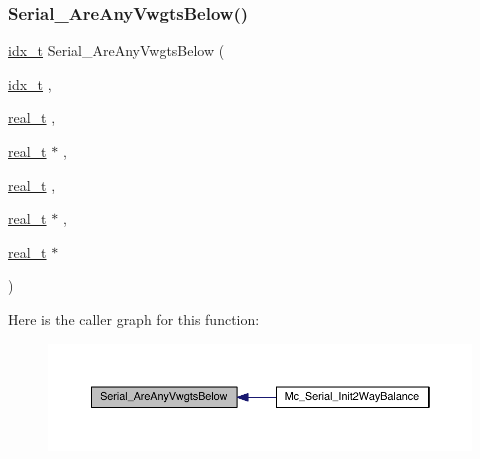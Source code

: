 \subsubsection{\texorpdfstring{Serial\+\_\+\+Are\+Any\+Vwgts\+Below()}{Serial\_AreAnyVwgtsBelow()}}
{\footnotesize\ttfamily \hyperlink{a00876_aaa5262be3e700770163401acb0150f52}{idx\+\_\+t} Serial\+\_\+\+Are\+Any\+Vwgts\+Below (\begin{DoxyParamCaption}\item[{\hyperlink{a00876_aaa5262be3e700770163401acb0150f52}{idx\+\_\+t}}]{,  }\item[{\hyperlink{a00876_a1924a4f6907cc3833213aba1f07fcbe9}{real\+\_\+t}}]{,  }\item[{\hyperlink{a00876_a1924a4f6907cc3833213aba1f07fcbe9}{real\+\_\+t} $\ast$}]{,  }\item[{\hyperlink{a00876_a1924a4f6907cc3833213aba1f07fcbe9}{real\+\_\+t}}]{,  }\item[{\hyperlink{a00876_a1924a4f6907cc3833213aba1f07fcbe9}{real\+\_\+t} $\ast$}]{,  }\item[{\hyperlink{a00876_a1924a4f6907cc3833213aba1f07fcbe9}{real\+\_\+t} $\ast$}]{ }\end{DoxyParamCaption})}

Here is the caller graph for this function\+:\nopagebreak
\begin{figure}[H]
\begin{center}
\leavevmode
\includegraphics[width=350pt]{a00951_ad7879274a6b65a679f0b7acf7ab84ca0_icgraph}
\end{center}
\end{figure}
\mbox{\label{a00951_ad43c6f51949b18b169f0597fc1362f74}} 
